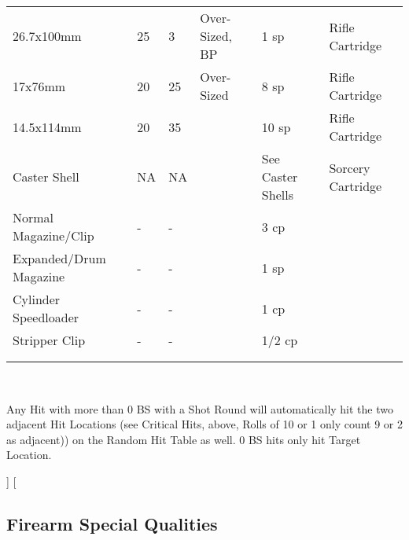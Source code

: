 \documentclass[a4paper, twocolumn, openany]{book}
\begin{document}
{{{\begin{tabular}{llllll}
	26.7x100mm 					& 25 	& 3 	& Over-Sized, BP	& 1 sp 				& Rifle Cartridge 	\\
	17x76mm 					& 20 	& 25 	& Over-Sized		& 8 sp 				& Rifle Cartridge 	\\
	14.5x114mm 					& 20 	& 35 	& 					& 10 sp 			& Rifle Cartridge	\\
	Caster Shell 				& NA 	& NA 	& 					& See Caster Shells & Sorcery Cartridge	\\
	Normal Magazine/Clip 		& - 	& - 	& 					& 3 cp 				& 					\\
	Expanded/Drum Magazine 		& - 	& - 	& 					& 1 sp 				& 					\\
	Cylinder Speedloader 		& - 	& - 	& 					& 1 cp 				& 					\\
	Stripper Clip 				& - 	& - 	& 					& 1/2 cp 			& 					\\
	\\ \hline \\
	\end{tabular}\\ }
	\dag Any Hit with more than 0 BS with a Shot Round will automatically hit the two adjacent
	Hit Locations (see Critical Hits, above, Rolls of 10 or 1 only count 9 or 2 as adjacent)) on
	the Random Hit Table as well. 0 BS hits only hit Target Location.\\
}]
\twocolumn[{
	\subsection{Firearm Special Qualities}

}}
\end{document}
